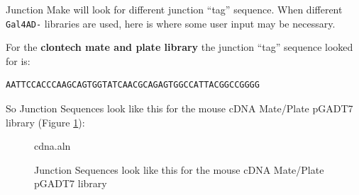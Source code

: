 \documentclass[11pt,fleqn]{book} %
\newcommand{\JunctionMake}{{\color{Blue} Junction Make }}
\begin{document}
\JunctionMake will look for different junction ``tag'' sequence. When different \texttt{Gal4AD-} libraries are used, here is where some user input may be necessary.

\vspace{15pt}

For the \textbf{clontech mate and plate library} the junction ``tag'' sequence looked for is:
\begin{lstlisting}
AATTCCACCCAAGCAGTGGTATCAACGCAGAGTGGCCATTACGGCCGGGG
\end{lstlisting}


So Junction Sequences look like this for the mouse cDNA Mate/Plate pGADT7 library (Figure \ref{fig:cdna-junction}):

\begin{figure}[!ht]
\centering
\begin{texshade}{cdna.aln}
%	
	\hideconsensus
	\hidenumbering
%	
%	
%	
\end{texshade}
\caption{Junction Sequences look like this for the mouse cDNA Mate/Plate pGADT7 library}
\label{fig:cdna-junction}
\end{figure}
\end{document}
